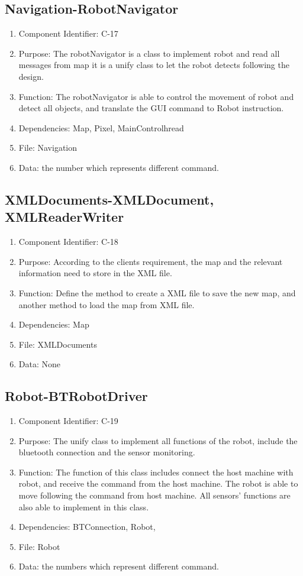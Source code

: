\documentclass[11pt, a4paper]{report}
\begin{document}
\subsection{Navigation-RobotNavigator}
\begin{enumerate}
\item Component Identifier: C-17
\item Purpose: The robotNavigator is a class to implement robot and read all messages from map it is a unify class to let the robot detects following the design. 
\item Function: The robotNavigator is able to control the movement of robot and detect all objects, and translate the GUI command to Robot instruction.   
\item Dependencies: Map, Pixel, MainControlhread
\item File: Navigation
\item Data: the number which represents different command.
\end{enumerate}

\subsection{XMLDocuments-XMLDocument, XMLReaderWriter}
\begin{enumerate}
\item Component Identifier: C-18
\item Purpose: According to the clients requirement, the map and the relevant information need to store in the XML file. 
\item Function: Define the method to create a XML file to save the new map, and another method to load the map from XML file.
\item Dependencies: Map
\item File: XMLDocuments
\item Data: None
\end{enumerate}

\subsection{Robot-BTRobotDriver}
\begin{enumerate}
\item Component Identifier: C-19
\item Purpose: The unify class to implement all functions of the robot, include the bluetooth connection and the sensor monitoring.
\item Function: The function of this class includes connect the host machine with robot, and receive the command from the host machine. The robot is able to move following the command from host machine. All sensors' functions are also able to implement in this class. 
\item Dependencies: BTConnection, Robot,
\item File: Robot
\item Data: the numbers which represent different command.
\end{enumerate}
\end{document}
